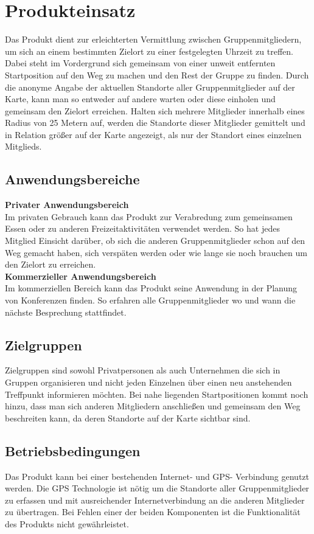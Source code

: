 
\section{Produkteinsatz}
Das Produkt dient zur erleichterten Vermittlung zwischen Gruppenmitgliedern, um sich an einem bestimmten Zielort zu einer festgelegten Uhrzeit zu treffen. Dabei steht im Vordergrund sich gemeinsam von einer unweit entfernten Startposition auf den Weg zu machen und den Rest der Gruppe zu finden. 
Durch die anonyme Angabe der aktuellen Standorte aller Gruppenmitglieder auf der Karte, kann man so entweder auf andere warten oder diese einholen und gemeinsam den Zielort erreichen. Halten sich mehrere Mitglieder innerhalb eines Radius von 25 Metern auf, werden die Standorte dieser Mitglieder gemittelt und in Relation größer auf der Karte angezeigt, als nur der Standort eines einzelnen Mitglieds.\\

\subsection{Anwendungsbereiche}
\textbf{Privater Anwendungsbereich} \\
Im privaten Gebrauch kann das Produkt zur Verabredung zum gemeinsamen Essen oder zu anderen Freizeitaktivitäten verwendet werden. So hat jedes Mitglied Einsicht darüber, ob sich die anderen Gruppenmitglieder schon auf den Weg gemacht haben, sich verspäten werden oder wie lange sie noch brauchen um den Zielort zu erreichen.\\

\textbf{Kommerzieller Anwendungsbereich} \\
Im kommerziellen Bereich kann das Produkt seine Anwendung in der Planung von Konferenzen finden. So erfahren alle Gruppenmitglieder wo und wann die nächste Besprechung stattfindet. \\

\subsection{Zielgruppen}
Zielgruppen sind sowohl Privatpersonen als auch Unternehmen die sich in Gruppen organisieren und nicht jeden Einzelnen über einen neu anstehenden Treffpunkt informieren möchten. Bei nahe liegenden Startpositionen kommt noch hinzu, dass man sich anderen Mitgliedern anschließen und gemeinsam den Weg beschreiten kann, da deren Standorte auf der Karte sichtbar sind.\\

\subsection{Betriebsbedingungen}
Das Produkt kann bei einer bestehenden Internet- und GPS- Verbindung genutzt werden. Die GPS Technologie ist nötig um die Standorte aller Gruppenmitglieder zu erfassen und mit ausreichender Internetverbindung an die anderen Mitglieder zu übertragen. Bei Fehlen einer der beiden Komponenten ist die Funktionalität des Produkts nicht gewährleistet.\\

